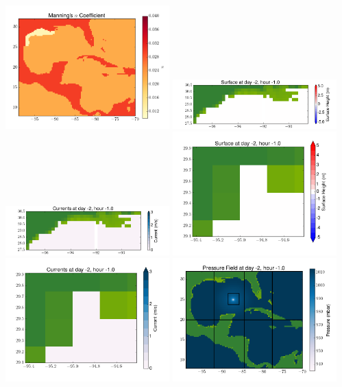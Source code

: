 \documentclass[11pt]{article}
\begin{document}
\vskip 10pt 
\includegraphics[width=0.475\textwidth]{frame0023fig3.png}
\includegraphics[width=0.475\textwidth]{frame0023fig4.png}
\vskip 10pt 
\includegraphics[width=0.475\textwidth]{frame0023fig5.png}
\includegraphics[width=0.475\textwidth]{frame0023fig6.png}
\vskip 10pt 
\includegraphics[width=0.475\textwidth]{frame0023fig7.png}
\includegraphics[width=0.475\textwidth]{frame0023fig8.png}
\end{document}
